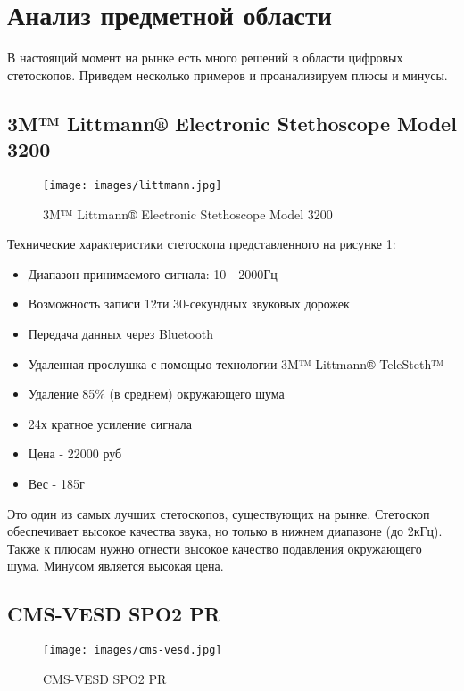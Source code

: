\documentclass[../main.tex]{subfiles}
\begin{document}
\section{Анализ предметной области}

В настоящий момент на рынке есть много решений в области цифровых стетоскопов. Приведем несколько примеров и проанализируем плюсы и минусы.

\subsection{3M™ Littmann® Electronic Stethoscope Model 3200}
\begin{figure}[H]
\centering
\texttt{[image: images/littmann.jpg]}
\caption{3M™ Littmann® Electronic Stethoscope Model 3200}
\end{figure}

Технические характеристики \cite{littmann} стетоскопа представленного на рисунке 1:
\begin{itemize}
  \item Диапазон принимаемого сигнала: 10 - 2000Гц
  \item Возможность записи 12ти 30-секундных звуковых дорожек
  \item Передача данных через Bluetooth
  \item Удаленная прослушка с помощью технологии 3M™ Littmann® TeleSteth™
  \item Удаление 85\% (в среднем) окружающего шума
  \item 24х кратное усиление сигнала
  \item Цена - 22000 руб
  \item Вес - 185г
\end{itemize}

Это один из самых лучших стетоскопов, существующих на рынке. Стетоскоп обеспечивает высокое качества звука, но только в нижнем диапазоне (до 2кГц). Также к плюсам нужно отнести высокое качество подавления окружающего шума. Минусом является высокая цена.

\subsection{CMS-VESD SPO2 PR}
\begin{figure}[H]
\centering
\texttt{[image: images/cms-vesd.jpg]}
\caption{CMS-VESD SPO2 PR}
\end{figure}
\end{document}
